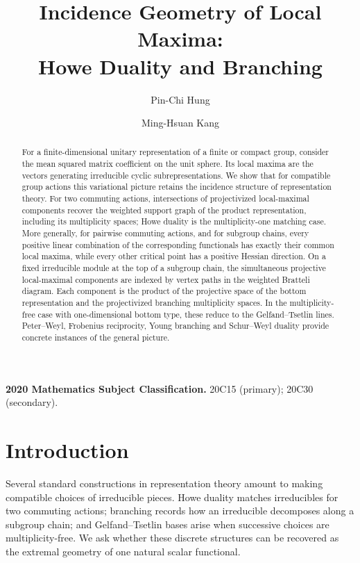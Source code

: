 \documentclass[10pt]{amsart}
\title{Incidence Geometry of Local Maxima:\\ Howe Duality and Branching}
\author{Pin-Chi Hung}
\author{Ming-Hsuan Kang}
\date{}
\theoremstyle{remark}
\begin{document}
\begin{abstract}
For a finite-dimensional unitary representation of a finite or compact group, consider the mean squared matrix coefficient
on the unit sphere. Its local maxima are the vectors generating irreducible cyclic subrepresentations.
We show that for compatible group actions this variational picture retains the incidence structure of
representation theory. For two commuting actions, intersections of projectivized local-maximal
components recover the weighted support graph of the product representation, including its multiplicity
spaces; Howe duality is the multiplicity-one matching case. More generally, for pairwise commuting
actions, and for subgroup chains, every positive linear combination of the corresponding functionals has
exactly their common local maxima, while every other critical point has a positive Hessian direction.
On a fixed irreducible module at the top of a subgroup chain, the simultaneous projective
local-maximal components are indexed by vertex paths in the weighted Bratteli diagram. Each component
is the product of the projective space of the bottom representation and the projectivized branching
multiplicity spaces. In the multiplicity-free case with one-dimensional bottom
type, these reduce to the Gelfand--Tsetlin lines. Peter--Weyl, Frobenius reciprocity, Young branching and
Schur--Weyl duality provide concrete instances of the general picture.
\end{abstract}

\maketitle

\medskip
\noindent\textbf{2020 Mathematics Subject Classification.}
20C15 (primary); 20C30 (secondary).

\section{Introduction}\label{sec:intro}

Several standard constructions in representation theory amount to making compatible choices of
irreducible pieces. Howe duality matches irreducibles for two commuting actions; branching records how
an irreducible decomposes along a subgroup chain; and Gelfand--Tsetlin bases arise when successive choices
are multiplicity-free. We ask whether these discrete structures can be recovered as the extremal
geometry of one natural scalar functional.
\end{document}
